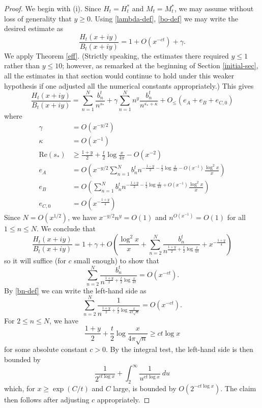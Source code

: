 \documentclass[a4paper,11pt,twoside]{amsart}
\begin{document}
\begin{proof}  We begin with (i).  Since $H_t = H_t^*$ and $M_t = M_t^*$, we may assume without loss of generality that $y \geq 0$.
Using \eqref{lambda-def}, \eqref{bo-def} we may write the desired estimate as
$$ \frac{H_t(x+iy)}{B_t(x+iy)} = 1 + O(x^{-ct}) + \gamma.$$
We apply Theorem \ref{eff}.  (Strictly speaking, the estimates there required $y \leq 1$ rather than $y \leq 10$; however, as remarked at the beginning of Section \ref{initial-sec}, all the estimates in that section would continue to hold under this weaker hypothesis if one adjusted all the numerical constants appropriately.)  This gives
\begin{equation}\label{exp}
\frac{H_t(x+iy)}{B_t(x+iy)} = \sum_{n=1}^N \frac{b_n^t}{n^{s_*}} + \gamma \sum_{n=1}^N n^y \frac{b_n^t}{n^{\overline{s_*} + \kappa}} + O_{\leq}\left( e_A + e_B + e_{C,0} \right)
\end{equation}
where
\begin{align*}
\gamma &= O( x^{-y/2} ) \\
\kappa &= O(x^{-1}) \\
\mathrm{Re}(s_*) &\geq \frac{1+y}{2} + \frac{t}{2} \log \frac{x}{4\pi}  - O(x^{-2}) \\
e_A &= O\left( x^{-y/2} \sum_{n=1}^N b_n^t n^{-\frac{1-y}{2} - \frac{t}{2} \log \frac{x}{4\pi} - O(x^{-1})} \frac{\log^2 x}{x} \right) \\ 
e_B &= O\left( \sum_{n=1}^N b_n^t n^{-\frac{1+y}{2} - \frac{t}{2} \log \frac{x}{4\pi} + O(x^{-1})} \frac{\log^2 x}{x} \right) \\ 
e_{C,0} &= O\left( x^{-\frac{1+y}{4}} \right)
\end{align*}
Since $N = O(x^{1/2})$, we have $x^{-y/2} n^{y} = O(1)$ and $n^{O(x^{-1})} = O(1)$ for all $1 \leq n \leq N$.  We conclude that
$$\frac{H_t(x+iy)}{B_t(x+iy)} = 1 + \gamma + O\left( \frac{\log^2 x}{x} + \sum_{n=2}^N \frac{b_n^t}{n^{\frac{1+y}{2} + \frac{t}{2} \log \frac{x}{4\pi}}} + x^{-\frac{1+y}{4}} \right) $$
so it will suffice (for $c$ small enough) to show that
$$ \sum_{n=2}^N \frac{b_n^t}{n^{\frac{1+y}{2} + \frac{t}{2} \log \frac{x}{4\pi}}} = O( x^{-ct} ).$$
By \eqref{bn-def} we can write the left-hand side as
$$ \sum_{n=2}^N \frac{1}{n^{\frac{1+y}{2} + \frac{t}{2} \log \frac{x}{4\pi \sqrt{n}}}} = O( x^{-ct} ).$$
For $2 \leq n \leq N$, we have
$$ \frac{1+y}{2} + \frac{t}{2} \log \frac{x}{4\pi \sqrt{n}} \geq c t \log x $$
for some absolute constant $c>0$.  By the integral test, the left-hand side is then bounded by
$$ \frac{1}{2^{c t \log x}} + \int_2^\infty \frac{1}{u^{c t \log x}}\ du$$
which, for $x \geq \exp(C/t)$ and $C$ large, is bounded by $O(2^{-ct\log x})$.  The claim then follows after adjusting $c$ appropriately.


\end{proof}
\end{document}
